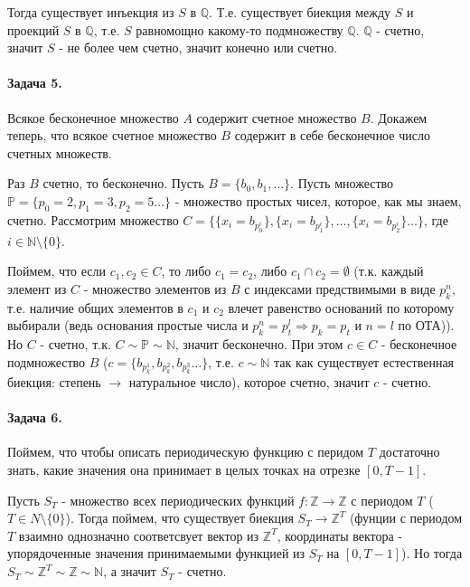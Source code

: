 \documentclass{article}
\begin{document}
    Тогда существует инъекция из $S$ в $\mathbb{Q}$. Т.е. существует биекция между $S$ и проекций $S$ в $\mathbb{Q}$, т.е. $S$ равномощно какому-то подмножеству $\mathbb{Q}$. $\mathbb{Q}$ - счетно, значит $S$ - не более чем счетно, значит конечно или счетно.

    \paragraph{Задача 5.}
    Всякое бесконечное множество $A$ содержит счетное множество $B$. Докажем теперь, что всякое счетное множество $B$ содержит в себе бесконечное число счетных множеств.

    Раз $B$ счетно, то бесконечно. Пусть $B = \{b_0, b_1, \ldots\}$. Пусть множество $\mathbb{P} = \{p_0 = 2, p_1 = 3, p_2 = 5 \ldots\}$ - множество простых чисел, которое, как мы знаем, счетно. Рассмотрим множество 
    $C = \{\{x_i = b_{p_0^i}\}, \{x_i = b_{p_1^i}\}, \ldots, \{x_i = b_{p_2^i}\} \ldots \}$, где $i \in \mathbb{N} \setminus \{0\}$. 

    Поймем, что  если $c_1, c_2 \in C$, то либо $c_1 = c_2$, либо $c_1 \cap c_2 = \emptyset$ (т.к. каждый элемент из $C$ - множество элементов из $B$ с индексами предствимыми в виде $p_k^n$, т.е. наличие общих элементов в $c_1$ и $c_2$ влечет равенство оснований по которому выбирали 
    (ведь основания простые числа и $p_k^n = p_t^l \Rightarrow p_k = p_t$ и $n = l$ по ОТА)).
    Но $C$ - счетно, т.к. $C \sim \mathbb{P} \sim \mathbb{N}$, значит бесконечно.
    При этом $c \in C$ - бесконечное подмножество $B$ ($c = \{b_{p_k^1}, b_{p_k^2}, b_{p_k^3} \ldots\}$, т.е. $c \sim \mathbb{N}$ так как существует естественная биекция: степень $\rightarrow$ натуральное число), которое счетно, значит $c$ - счетно.

    \paragraph{Задача 6.}
    Поймем, что чтобы описать периодическую функцию с перидом $T$ достаточно знать, 
    какие значения она принимает в целых точках на отрезке $[0, T - 1]$. 

    Пусть $S_T$ - множество всех периодических функций $f: \mathbb{Z} \rightarrow \mathbb{Z}$ с периодом $T$ ($T \in N \setminus \{0\}$). 
    Тогда поймем, что существует биекция $S_T \rightarrow \mathbb{Z}^T$
    (фунции с периодом $T$ взаимно однозначно соответсвует вектор из $\mathbb{Z}^T$, координаты вектора - упорядоченные значения принимаемыми функцией из $S_T$ на $[0, T - 1]$).
    Но тогда $S_T \sim \mathbb{Z}^T \sim \mathbb{Z} \sim \mathbb{N}$, а значит $S_T$ - счетно.
\end{document}

